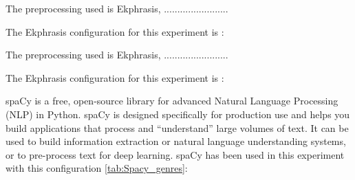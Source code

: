 \documentclass[12pt, a4paper]{article}
\begin{document}




The preprocessing used is Ekphrasis, ........................

\hfill\break
The Ekphrasis configuration for this experiment is :



The preprocessing used is Ekphrasis, ........................

\hfill\break
The Ekphrasis configuration for this experiment is :




spaCy is a free, open-source library for advanced Natural Language Processing (NLP) in Python.
spaCy is designed specifically for production use and helps you build applications that process and “understand”
large volumes of text. It can be used to build information extraction or natural language understanding systems,
or to pre-process text for deep learning.
spaCy has been used in this experiment with this configuration \ref{tab:Spacy_genres}:
\end{document}
